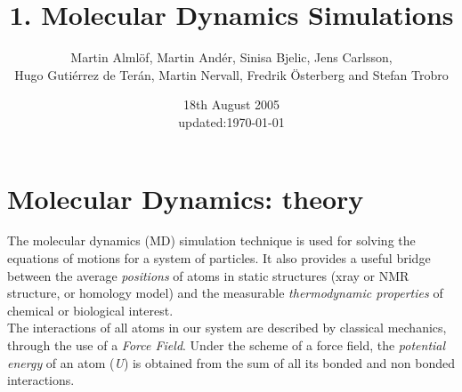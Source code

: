 \documentclass[a4paper,12pt]{article}
\title{1. Molecular Dynamics Simulations}
\author{Martin Alml\"{o}f, Martin And\'er, Sinisa Bjelic, Jens Carlsson, \\ Hugo Guti\'errez de Ter\'an, Martin Nervall, Fredrik \"{O}sterberg and Stefan Trobro}
\date{18th August 2005 \\ \footnotesize{updated:\today}}
\begin{document}
\maketitle
\tableofcontents
\newpage
%
%


\section{Molecular Dynamics: theory}



The molecular dynamics (MD) simulation technique is used for solving the equations of motions for a system of particles. It also provides a useful bridge between the average {\it positions} of atoms in static  structures (xray or NMR structure, or homology model) and the measurable {\it thermodynamic properties} of chemical or biological interest.\\
The interactions of all atoms in our system are described by
classical mechanics, through the use of a {\it Force Field}. Under
the scheme of a force field, the {\it potential energy} of an atom
({\it U}) is obtained from the sum of all its bonded and non
bonded interactions. \newline
\end{document}

